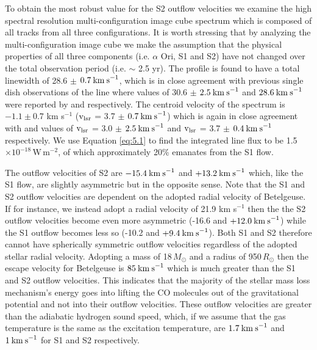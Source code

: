 To obtain the most robust value for the S2 outflow velocities we examine the high spectral resolution multi-configuration image cube spectrum which is composed of all tracks from all three configurations. It is worth stressing that by analyzing the multi-configuration image cube we make the assumption that the physical properties of all three components (i.e. $\alpha$ Ori, S1 and S2) have not changed over the total observation period (i.e. $\sim$ 2.5 yr). The profile is found to have a total linewidth of 28.6 $\pm$ $0.7\>{\rm km\>s}^{-1}$, which is in close agreement with previous single dish observations of the line where values of 30.6 $\pm$ $2.5\>{\rm km\>s}^{-1}$ and $28.6\>{\rm km\>s}^{-1}$ were reported by \cite{knapp_1980} and \cite{huggins_1987} respectively. The centroid velocity of the spectrum is  $-1.1 \pm 0.7$ km s$^{-1}$ ($\rm{v_{\rm{lsr}}}$ = 3.7 $\pm$ $0.7\>{\rm km\>s}^{-1}$) which is again in close agreement with \cite{knapp_1980} and \cite{huggins_1987} values of $\rm{v_{lsr}}$ = 3.0 $\pm$ $2.5\>{\rm km\>s}^{-1}$ and $\rm{v_{lsr}}$ = 3.7 $\pm$ $0.4\>{\rm km\>s}^{-1}$ respectively. We use Equation \ref{eq:5.1} to find the integrated line flux to be 1.5 $\times 10^{-18}$\,W\,m$^{-2}$, of which approximately 20\% emanates from the S1 flow.

The outflow velocities of S2 are $-15.4\>{\rm km\>s}^{-1}$ and $+13.2\>{\rm km\>s}^{-1}$ which, like the S1 flow, are slightly asymmetric but in the opposite sense. Note that the S1 and S2 outflow velocities are dependent on the adopted radial velocity of Betelgeuse. If for instance, we instead adopt a radial velocity of 21.9 km s${}^{-1}$ \citep{famaey_2005} then the the S2 outflow velocities become even more asymmetric (-16.6 and $+12.0\>{\rm km\>s}^{-1}$) while the S1 outflow becomes less so (-10.2 and $+9.4\>{\rm km\>s}^{-1}$). Both S1 and S2 therefore cannot have spherically symmetric outflow velocities regardless of the adopted stellar radial velocity. Adopting a mass of 18\,$M_{\odot}$ and a radius of 950\,$R_{\odot}$ \citep{harper_2008} then the escape velocity for Betelgeuse is $85\>{\rm km\>s}^{-1}$ which is much greater than the S1 and S2 outflow velocities. This indicates that the majority of the stellar mass loss mechanism's energy goes into lifting the CO molecules out of the gravitational potential and not into their outflow velocities. These outflow velocities are greater than the adiabatic hydrogen sound speed, which, if we assume that the gas temperature is the same as the excitation temperature, are $1.7\>{\rm km\>s}^{-1}$ and $1\>{\rm km\>s}^{-1}$ for S1 and S2 respectively. 

